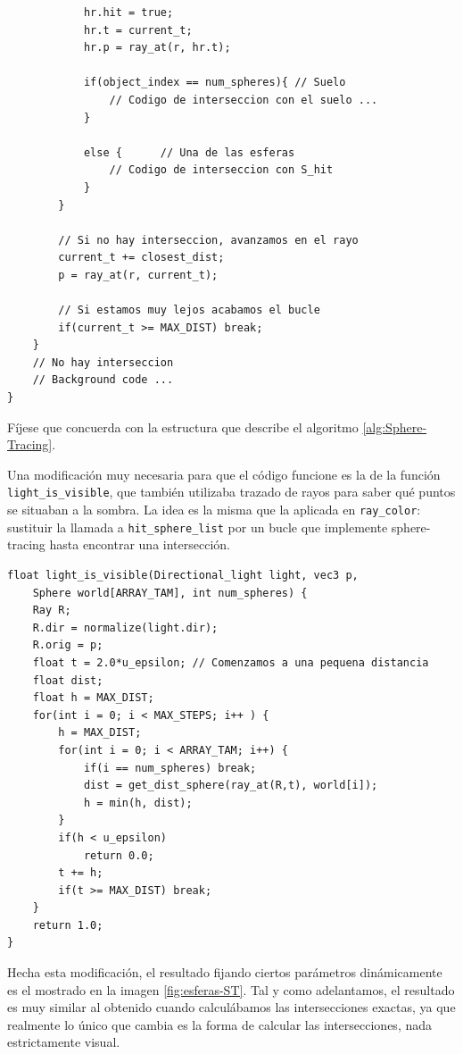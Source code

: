 \begin{lstlisting}
            hr.hit = true;
            hr.t = current_t;
            hr.p = ray_at(r, hr.t);

            if(object_index == num_spheres){ // Suelo
                // Codigo de interseccion con el suelo ...
            }

            else {      // Una de las esferas
                // Codigo de interseccion con S_hit
            }
        }

        // Si no hay interseccion, avanzamos en el rayo
        current_t += closest_dist;
        p = ray_at(r, current_t);

        // Si estamos muy lejos acabamos el bucle
        if(current_t >= MAX_DIST) break;
    }
    // No hay interseccion
    // Background code ...       
}
\end{lstlisting}

Fíjese que concuerda con la estructura que describe el algoritmo \ref{alg:Sphere-Tracing}. 

Una modificación muy necesaria para que el código funcione es la de la función \verb|light_is_visible|, que también utilizaba trazado de rayos para saber qué puntos se situaban a la sombra. La idea es la misma que la aplicada en \verb|ray_color|: sustituir la llamada a \verb|hit_sphere_list| por un bucle que implemente sphere-tracing hasta encontrar una intersección.

\begin{lstlisting}
float light_is_visible(Directional_light light, vec3 p, 
    Sphere world[ARRAY_TAM], int num_spheres) {
    Ray R;
    R.dir = normalize(light.dir);
    R.orig = p;
    float t = 2.0*u_epsilon; // Comenzamos a una pequena distancia
    float dist;
    float h = MAX_DIST;
    for(int i = 0; i < MAX_STEPS; i++ ) {
        h = MAX_DIST;
        for(int i = 0; i < ARRAY_TAM; i++) {
            if(i == num_spheres) break;
            dist = get_dist_sphere(ray_at(R,t), world[i]);
            h = min(h, dist);
        }
        if(h < u_epsilon)
            return 0.0;
        t += h;
        if(t >= MAX_DIST) break;
    }
    return 1.0;
}
\end{lstlisting}

Hecha esta modificación, el resultado fijando ciertos parámetros dinámicamente es el mostrado en la imagen \ref{fig:esferas-ST}. Tal y como adelantamos, el resultado es muy similar al obtenido cuando calculábamos las intersecciones exactas, ya que realmente lo único que cambia es la forma de calcular las intersecciones, nada estrictamente visual.

